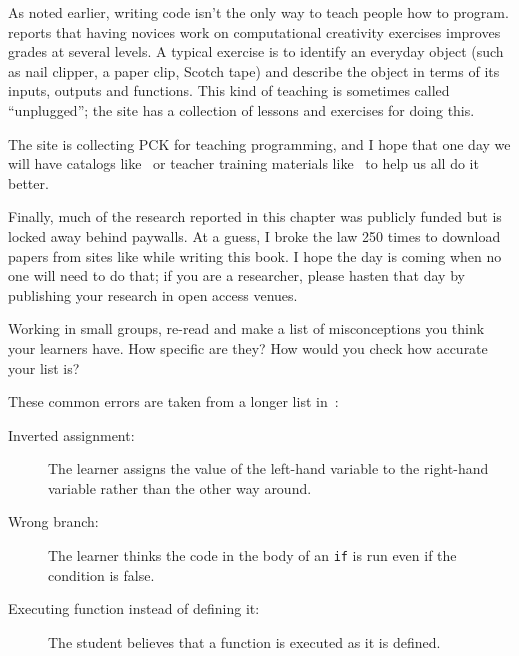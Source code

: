 As noted earlier, writing code isn't the only way to teach people how to program. \cite{Shel2017} reports that having novices work on computational creativity exercises improves grades at several levels. A typical exercise is to identify an everyday object (such as nail clipper, a paper clip, Scotch tape) and describe the object in terms of its inputs, outputs and functions. This kind of teaching is sometimes called ``unplugged''; the  site has a collection of lessons and exercises for doing this.


The  site
is collecting PCK for teaching programming,
and I hope that one day we will have catalogs like~\cite{Ojos2015}
or teacher training materials like~\cite{Hazz2014,Guzd2015a,Sent2018}
to help us all do it better.

Finally,
much of the research reported in this chapter was publicly funded
but is locked away behind paywalls.
At a guess,
I broke the law 250 times to download papers from sites like 
while writing this book.
I hope the day is coming when no one will need to do that;
if you are a researcher,
please hasten that day by publishing your research in open access venues.



Working in small groups,
re-read  and make a list of misconceptions you think your learners have.
How specific are they?
How would you check how accurate your list is?


These common errors are taken from a longer list in~\cite{Sirk2012}:

\begin{description}

\item[Inverted assignment:]
  The learner assigns the value of the left-hand variable to the right-hand variable
  rather than the other way around.

\item[Wrong branch:]
  The learner thinks the code in the body of an \texttt{if} is run
  even if the condition is false.

\item[Executing function instead of defining it:]
  The student believes that a function is executed as it is defined.

\end{description}

